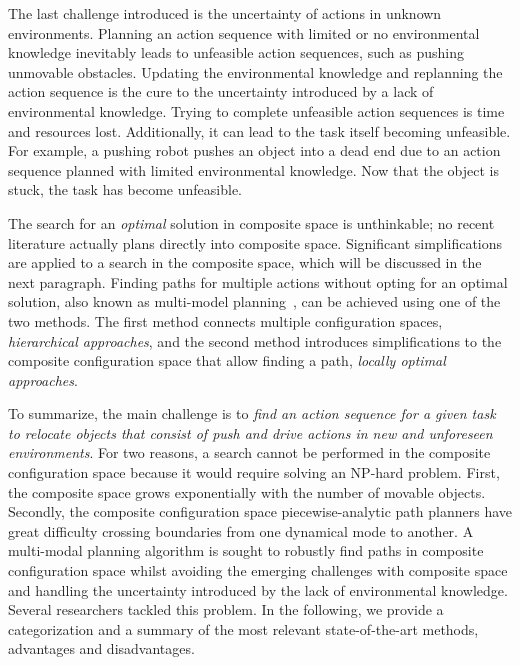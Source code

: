 The last challenge introduced is the uncertainty of actions in unknown environments. Planning an action sequence with limited or no environmental knowledge inevitably leads to unfeasible action sequences, such as pushing unmovable obstacles. Updating the environmental knowledge and replanning the action sequence is the cure to the uncertainty introduced by a lack of environmental knowledge. Trying to complete unfeasible action sequences is time and resources lost. Additionally, it can lead to the task itself becoming unfeasible. For example, a pushing robot pushes an object into a dead end due to an action sequence planned with limited environmental knowledge. Now that the object is stuck, the task has become unfeasible.\bs

The search for an \textit{optimal} solution in composite space is unthinkable; no recent literature actually plans directly into composite space. Significant simplifications are applied to a search in the composite space, which will be discussed in the next paragraph. Finding paths for multiple actions without opting for an optimal solution, also known as multi-model planning~\cite{hauser_multimodal_2010}, can be achieved using one of the two methods. The first method connects multiple configuration spaces, \textit{hierarchical approaches}, and the second method introduces simplifications to the composite configuration space that allow finding a path, \textit{locally optimal approaches}.\bs

To summarize, the main challenge is to \textit{find an action sequence for a given task to relocate objects that consist of push and drive actions in new and unforeseen environments}. For two reasons, a search cannot be performed in the composite configuration space because it would require solving an \ac{NP-hard} problem. First, the composite space grows exponentially with the number of movable objects. Secondly, the composite configuration space piecewise-analytic path planners have great difficulty crossing boundaries from one dynamical mode to another. A multi-modal planning algorithm is sought to robustly find paths in composite configuration space whilst avoiding the emerging challenges with composite space and handling the uncertainty introduced by the lack of environmental knowledge. Several researchers tackled this problem. In the following, we provide a categorization and a summary of the most relevant state-of-the-art methods, advantages and disadvantages.\bs


